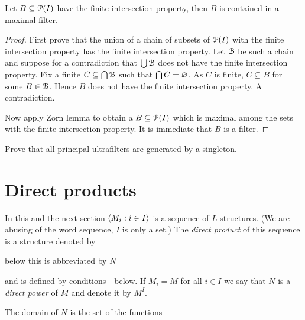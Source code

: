 \documentclass[creche.tex]{subfiles}
\begin{document}
\begin{proposition}\label{esistenzamassimale1}
Let $B\subseteq\P(I)$ have the finite intersection property, then $B$ is contained in a maximal filter.
\end{proposition}

\begin{proof}
First prove that the union of a chain of subsets of $\P(I)$ with the finite intersection property has the finite intersection property. Let $\B$ be such a chain and suppose for a contradiction that $\bigcup\B$ does not have the finite intersection property. Fix a finite $C\subseteq\bigcap\B$ such that $\bigcap  C=\0$. As $C$ is finite, $C\subseteq B$ for some $B\in\B$. Hence $B$ does not have the finite intersection property. A contradiction.


Now apply Zorn lemma to obtain a $B\subseteq\P(I)$ which is maximal among the sets with the finite intersection property. It is immediate that $B$ is a filter.
\end{proof}

\begin{exercise}
Prove that all principal ultrafilters are generated by a singleton.\QED
\end{exercise}



\section{Direct products}
\label{prodottidiretti}

In this and the next section $\<M_i:i\in I\>$ is a sequence of $L$-structures. (We are abusing of the word sequence, $I$ is only a set.) The \emph{direct product\/} of this sequence is a structure denoted by

\hfill below this is abbreviated by  \emph{$N$\/}

and is defined by conditions - below. If $M_i=M$ for all $i\in I$ we say that $N$ is a \emph{direct power\/} of $M$ and denote it by \emph{$M^I$}.

The domain of $N$ is the set of the functions

\smallskip
\end{document}
